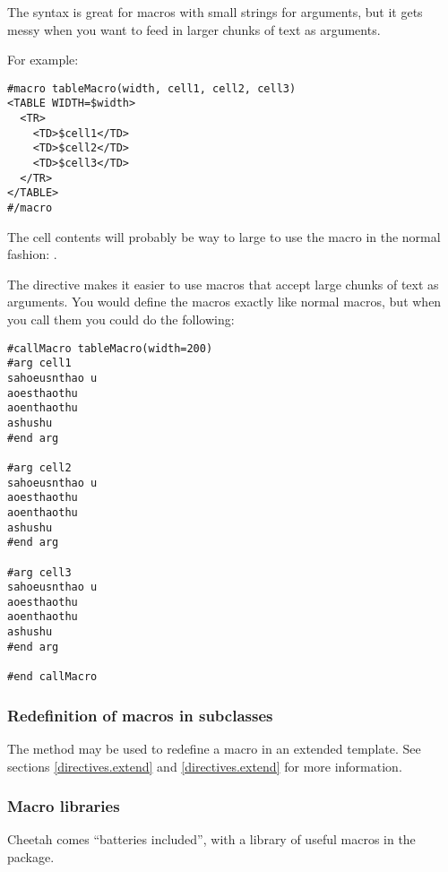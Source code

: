 The  syntax is great for macros with small strings for
arguments, but it gets messy when you want to feed in larger chunks of text as
arguments.  

For example:
\begin{verbatim}
#macro tableMacro(width, cell1, cell2, cell3)
<TABLE WIDTH=$width>
  <TR>
    <TD>$cell1</TD>
    <TD>$cell2</TD>
    <TD>$cell3</TD>
  </TR>
</TABLE>
#/macro
\end{verbatim}

The cell contents will probably be way to large to use the macro in the normal
fashion: .

The  directive makes it easier to use macros that accept
large chunks of text as arguments.  You would define the macros exactly like
normal macros, but when you call them you could do the following:

\begin{verbatim}
#callMacro tableMacro(width=200)
#arg cell1
sahoeusnthao u
aoesthaothu
aoenthaothu
ashushu
#end arg

#arg cell2
sahoeusnthao u
aoesthaothu
aoenthaothu
ashushu
#end arg

#arg cell3
sahoeusnthao u
aoesthaothu
aoenthaothu
ashushu
#end arg 

#end callMacro

\end{verbatim}


\subsubsection{Redefinition of macros in subclasses}
\label{directives.macros.redefine}

The  method may be used to
redefine a macro in an extended template.  See sections \ref{directives.extend}
and \ref{directives.extend} for more information.

\subsubsection{Macro libraries}
\label{directives.macros.libraries}

Cheetah comes ``batteries included'', with a library of useful macros in the
 package.  


